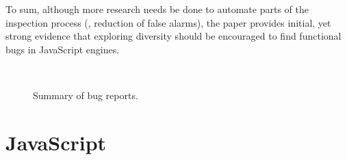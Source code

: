 \documentclass[sigconf,review, anonymous]{acmart}
\begin{document}
\vspace{1ex} To sum, although more research needs be done to automate
parts of the inspection process (\eg{}, reduction of false alarms),
the paper provides initial, yet strong evidence that exploring
diversity should be encouraged to find functional bugs in JavaScript
engines.

\begin{figure}[t]
  \centering
  \\
  \caption{\label{fig:summary}Summary of bug reports.}
  \vspace{-3ex}
\end{figure}

\section{JavaScript}
\label{sec:es6-design}
\label{sec:imp-dep-behavior}
\end{document}
